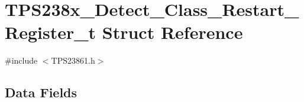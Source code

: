 \hypertarget{struct_t_p_s238x___detect___class___restart___register__t}{\section{T\-P\-S238x\-\_\-\-Detect\-\_\-\-Class\-\_\-\-Restart\-\_\-\-Register\-\_\-t Struct Reference}
\label{struct_t_p_s238x___detect___class___restart___register__t}
}


{\ttfamily \#include $<$T\-P\-S23861.\-h$>$}

\subsection*{Data Fields}
